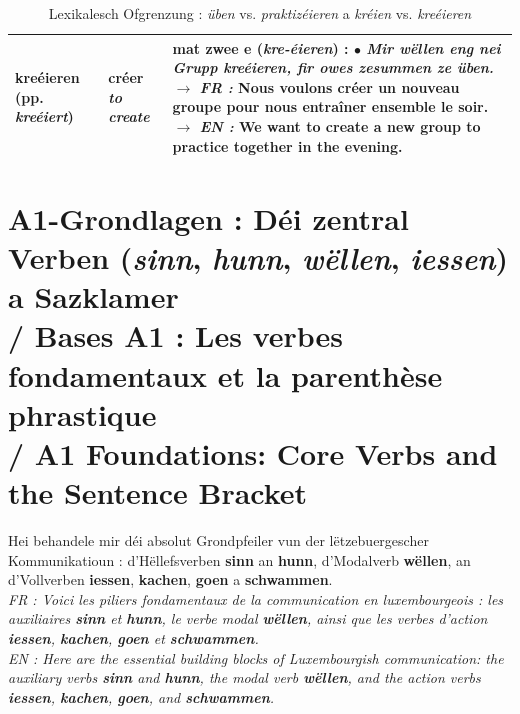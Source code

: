 \begin{table}[htbp]
\begin{tabular}{p{3.2cm}p{3.0cm}p{9.0cm}}
        \midrule
        \textbf{kreéieren} \newline (pp. \textit{kreéiert}) & créer \newline \textit{to create} & mat zwee \textbf{e} (\textit{kre-éieren}) : \newline $\bullet$ \textit{Mir wëllen eng nei Grupp \textbf{kreéieren}, fir owes zesummen ze üben.} \newline $\rightarrow$ \textit{FR :} Nous voulons créer un nouveau groupe pour nous entraîner ensemble le soir. \newline $\rightarrow$ \textit{EN :} We want to create a new group to practice together in the evening. \\
        \bottomrule
    \end{tabular}
    \caption{Lexikalesch Ofgrenzung : \textit{üben} vs. \textit{praktizéieren} a \textit{kréien} vs. \textit{kreéieren}}
\end{table}

\vspace{1.5em}

\section[A1-Grondlagen: Déi zentral Verben a Sazklamer / Core A1 Verbs and Sentence Bracket]{A1-Grondlagen : Déi zentral Verben (\textit{sinn}, \textit{hunn}, \textit{wëllen}, \textit{iessen}) a Sazklamer \\/ Bases A1 : Les verbes fondamentaux et la parenthèse phrastique \\/ A1 Foundations: Core Verbs and the Sentence Bracket}

Hei behandele mir déi absolut Grondpfeiler vun der lëtzebuergescher Kommunikatioun : d'Hëllefsverben \textbf{sinn} an \textbf{hunn}, d'Modalverb \textbf{wëllen}, an d'Vollverben \textbf{iessen}, \textbf{kachen}, \textbf{goen} a \textbf{schwammen}. \\
\textit{FR : Voici les piliers fondamentaux de la communication en luxembourgeois : les auxiliaires \textbf{sinn} et \textbf{hunn}, le verbe modal \textbf{wëllen}, ainsi que les verbes d'action \textbf{iessen}, \textbf{kachen}, \textbf{goen} et \textbf{schwammen}.} \\
\textit{EN : Here are the essential building blocks of Luxembourgish communication: the auxiliary verbs \textbf{sinn} and \textbf{hunn}, the modal verb \textbf{wëllen}, and the action verbs \textbf{iessen}, \textbf{kachen}, \textbf{goen}, and \textbf{schwammen}.}

